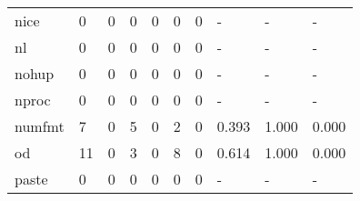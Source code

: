 \begin{longtable}{lp{1.3cm}p{1.3cm}p{1.3cm}p{1.3cm}p{1.3cm}p{1.3cm}p{1.3cm}p{1.3cm}p{1.3cm}}
nice      &                      0 &                                             0 &                                            0 &                                           0 &                                            0 &                                          0 &                                    - &                                      - &                                    - \\
nl        &                      0 &                                             0 &                                            0 &                                           0 &                                            0 &                                          0 &                                    - &                                      - &                                    - \\
nohup     &                      0 &                                             0 &                                            0 &                                           0 &                                            0 &                                          0 &                                    - &                                      - &                                    - \\
nproc     &                      0 &                                             0 &                                            0 &                                           0 &                                            0 &                                          0 &                                    - &                                      - &                                    - \\
numfmt    &                      7 &                                             0 &                                            5 &                                           0 &                                            2 &                                          0 &                                0.393 &                                  1.000 &                                0.000 \\
od        &                     11 &                                             0 &                                            3 &                                           0 &                                            8 &                                          0 &                                0.614 &                                  1.000 &                                0.000 \\
paste     &                      0 &                                             0 &                                            0 &                                           0 &                                            0 &                                          0 &                                    - &                                      - &                                    - \\

\end{longtable}
